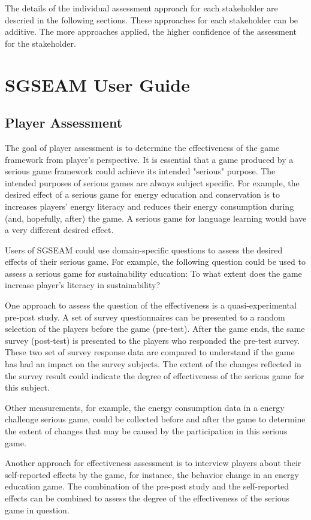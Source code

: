 \documentclass[11pt]{article}
\begin{document}
The details of the individual assessment approach for each stakeholder are descried in the following sections. These approaches for each stakeholder can be additive. The more approaches applied, the higher confidence of the assessment for the stakeholder.

\section{SGSEAM User Guide}
\subsection{Player Assessment}

The goal of player assessment is to determine the effectiveness of the game
framework from player's perspective. It is essential that a game produced by a serious game
framework could achieve its intended "serious" purpose. The intended purposes of serious games are
always subject specific. For example, the desired effect of a serious game for
energy education and conservation is to increases players' energy literacy and
reduces their energy consumption during (and, hopefully, after) the game. A serious game for
language learning would have a very different desired effect.

Users of SGSEAM could use domain-specific questions to assess the desired effects of their
serious game. For example, the following question could be used to assess a serious
game for sustainability education: To what extent does the game increase player's literacy in
sustainability? 

One approach to assess the question of the effectiveness is a quasi-experimental pre-post
study. A set of survey questionnaires can be presented to a random selection of the players
before the game (pre-test). After the game ends, the same survey (post-test) is presented to the
players who responded the pre-test survey. These two set of survey response data are compared to
understand if the game has had an impact on the survey subjects. The extent of the changes reflected in the survey result could indicate the degree of effectiveness of the serious game for this subject.

Other measurements, for example, the energy consumption data in a energy challenge serious game, could be collected before and after the game to determine the extent of changes that may be caused by the participation in this serious game.

Another approach for effectiveness assessment is to interview players about their self-reported
effects by the game, for instance, the behavior change in an energy education game. The combination of the pre-post study and the self-reported effects
can be combined to assess the degree of the effectiveness of the serious game in question.
\end{document}
